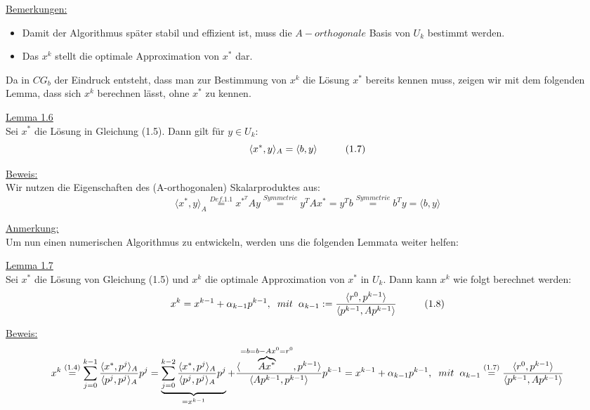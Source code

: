 \documentclass[a4paper]{letter}
\begin{document}
\underline{Bemerkungen:}
\begin{itemize}
	\item Damit der Algorithmus sp\"ater stabil und effizient ist, muss die $A-orthogonale$ Basis von $U_{k}$ bestimmt werden.
	\item Das $x^{k}$ stellt die optimale Approximation von $x^{*}$ dar.
\end{itemize}

Da in $CG_{b}$ der Eindruck entsteht, dass man zur Bestimmung von $x^{k}$ die L\"osung $x^{*}$ bereits kennen muss, zeigen wir mit dem folgenden Lemma, dass sich $x^{k}$ berechnen l\"asst, ohne $x^{*}$ zu kennen.

\underline{Lemma 1.6}
\\Sei $x^{*}$ die L\"osung in Gleichung (1.5). Dann gilt f\"ur $y \in U_{k}$:
$$\langle x^{*}, y \rangle _{A} = \langle b, y \rangle \hspace{10mm} (1.7)$$

\underline{Beweis:}
\\Wir nutzen die Eigenschaften des (A-orthogonalen) Skalarproduktes aus:
$$\langle x^{*}, y \rangle _{A} \overset{Def. 1.1}{=} x^{{*}^{T}}Ay \overset{Symmetrie}{=} y^{T}Ax^{*} = y^{T}b \overset{Symmetrie}{=} b^{T}y = \langle b, y \rangle$$

\underline{Anmerkung:}
\\Um nun einen numerischen Algorithmus zu entwickeln, werden uns die folgenden Lemmata weiter helfen:

\underline{Lemma 1.7}
\\Sei $x^{*}$ die L\"osung von Gleichung (1.5) und $x^{k}$ die optimale Approximation von $x^{*}$ in $U_{k}$. Dann kann $x^{k}$ wie folgt berechnet werden:
$$x^{k} = x^{k-1} + \alpha_{k-1}p^{k-1}, \hspace{2mm} mit \hspace{2mm} \alpha_{k-1} := \frac {\langle r^{0}, p^{k-1} \rangle} {\langle {p^{k-1}, Ap^{k-1}} \rangle} \hspace{10mm} (1.8)$$

\underline{Beweis:}
$$x^{k} \overset{(1.4)}{=}
\sum_{j=0}^{k-1} \frac {\langle x^{*}, p^{j} \rangle _{A}} {\langle {p^{j}, p^{j}} \rangle _{A}} p^{j} =
\underbrace{\sum_{j=0}^{k-2} \frac {\langle x^{*}, p^{j} \rangle _{A}} {\langle {p^{j}, p^{j}} \rangle _{A}} p^{j}}_{=x^{k-1}} +
\frac {\langle \overbrace{Ax^{*}}^{=b=b-Ax^{0}=r^{0}}, p^{k-1} \rangle} {\langle {Ap^{k-1}, p^{k-1}} \rangle} p^{k-1} =
x^{k-1} + \alpha_{k-1}p^{k-1}, \hspace{2mm} mit \hspace{2mm} \alpha_{k-1} \overset{(1.7)}{=}
\frac {\langle r^{0}, p^{k-1} \rangle} {\langle {p^{k-1}, Ap^{k-1}} \rangle}$$
\end{document}

